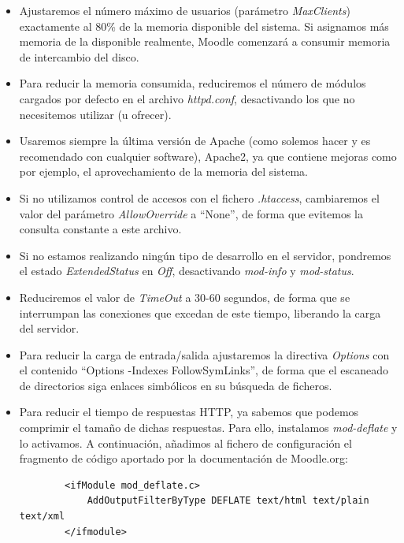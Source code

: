 	\begin{itemize}
		\item Ajustaremos el número máximo de usuarios (parámetro \emph{MaxClients}) exactamente al 80\% de la memoria disponible del sistema. Si asignamos más memoria de la disponible realmente, Moodle comenzará a consumir memoria de intercambio del disco.
		\item Para reducir la memoria consumida, reduciremos el número de módulos cargados por defecto en el archivo \emph{httpd.conf}, desactivando los que no necesitemos utilizar (u ofrecer).
		\item Usaremos siempre la última versión de Apache (como solemos hacer y es recomendado con cualquier software), Apache2, ya que contiene mejoras como por ejemplo, el aprovechamiento de la memoria del sistema.
		\item Si no utilizamos control de accesos con el fichero \emph{.htaccess}, cambiaremos el valor del parámetro \emph{AllowOverride} a ``None'', de forma que evitemos la consulta constante a este archivo.
		\item Si no estamos realizando ningún tipo de desarrollo en el servidor, pondremos el estado \emph{ExtendedStatus} en \emph{Off}, desactivando \emph{mod-info} y \emph{mod-status}.
		\item Reduciremos el valor de \emph{TimeOut} a 30-60 segundos, de forma que se interrumpan las conexiones que excedan de este tiempo, liberando la carga del servidor.
		\item Para reducir la carga de entrada/salida ajustaremos la directiva \emph{Options} con el contenido ``Options -Indexes FollowSymLinks'', de forma que el escaneado de directorios siga enlaces simbólicos en su búsqueda de ficheros.
		\item Para reducir el tiempo de respuestas HTTP, ya sabemos que podemos comprimir el tamaño de dichas respuestas. Para ello, instalamos \emph{mod-deflate} \cite{moddeflate} y lo activamos. A continuación, añadimos al fichero de configuración el fragmento de código aportado por la documentación de Moodle.org:
		\begin{verbatim}
		<ifModule mod_deflate.c>
  		    AddOutputFilterByType DEFLATE text/html text/plain text/xml
		</ifmodule>
		\end{verbatim}
	\end{itemize}


